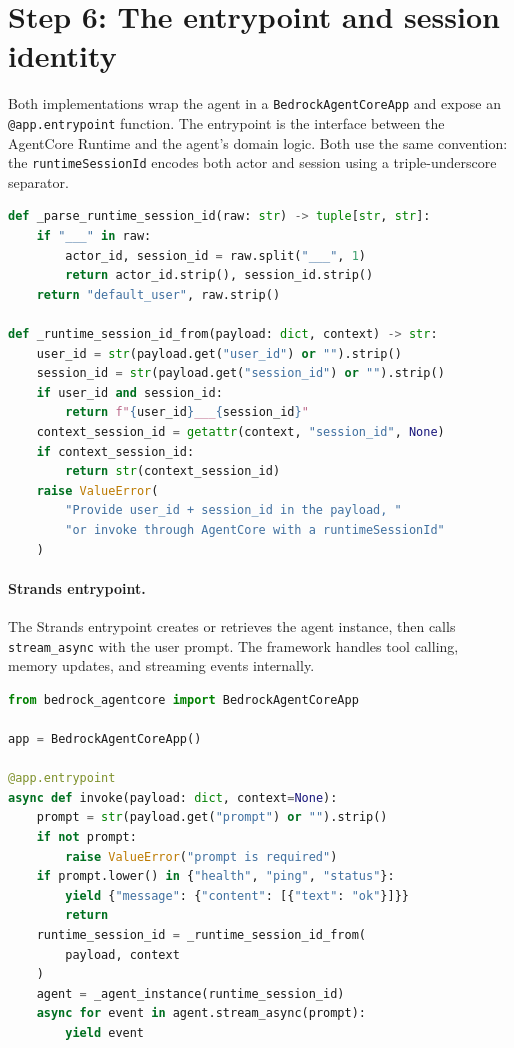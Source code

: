 \section{Step 6: The entrypoint and session identity}

Both implementations wrap the agent in a \texttt{BedrockAgentCoreApp} and expose an
\texttt{@app.entrypoint} function. The entrypoint is the interface between the AgentCore
Runtime and the agent's domain logic. Both use the same convention: the
\texttt{runtimeSessionId} encodes both actor and session using a triple-underscore
separator.

\begin{lstlisting}[language=Python]
def _parse_runtime_session_id(raw: str) -> tuple[str, str]:
    if "___" in raw:
        actor_id, session_id = raw.split("___", 1)
        return actor_id.strip(), session_id.strip()
    return "default_user", raw.strip()

def _runtime_session_id_from(payload: dict, context) -> str:
    user_id = str(payload.get("user_id") or "").strip()
    session_id = str(payload.get("session_id") or "").strip()
    if user_id and session_id:
        return f"{user_id}___{session_id}"
    context_session_id = getattr(context, "session_id", None)
    if context_session_id:
        return str(context_session_id)
    raise ValueError(
        "Provide user_id + session_id in the payload, "
        "or invoke through AgentCore with a runtimeSessionId"
    )
\end{lstlisting}

\paragraph{Strands entrypoint.}

The Strands entrypoint creates or retrieves the agent instance, then calls
\texttt{stream\_async} with the user prompt. The framework handles tool calling, memory
updates, and streaming events internally.

\begin{lstlisting}[language=Python]
from bedrock_agentcore import BedrockAgentCoreApp

app = BedrockAgentCoreApp()

@app.entrypoint
async def invoke(payload: dict, context=None):
    prompt = str(payload.get("prompt") or "").strip()
    if not prompt:
        raise ValueError("prompt is required")
    if prompt.lower() in {"health", "ping", "status"}:
        yield {"message": {"content": [{"text": "ok"}]}}
        return
    runtime_session_id = _runtime_session_id_from(
        payload, context
    )
    agent = _agent_instance(runtime_session_id)
    async for event in agent.stream_async(prompt):
        yield event
\end{lstlisting}

